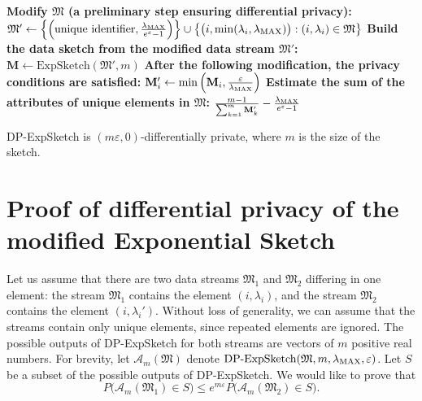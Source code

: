 \begin{algorithm}[htbp]
\caption{DP-ExpSketch($\mathfrak{M}, m, \lmax, \varepsilon$)}
\label{alg:df_expsketch}
\begin{algorithmic}[1]
\State \textbf{Modify $\mathfrak{M}$ (a preliminary step ensuring differential privacy):}
\State $\mathfrak{M}' \gets \left\{ \left(\text{unique identifier}, \frac{\lambda_{\mathrm{MAX}}}{e^\varepsilon - 1}\right) \right\} \cup \left\{ \bigl(i, \min(\lambda_i, \lambda_{\mathrm{MAX}})\bigr) : (i,\lambda_i) \in \mathfrak{M} \right\}$ \label{line:df_expsketch_modify_1}
\State
\State \textbf{Build the data sketch from the modified data stream $\mathfrak{M}'$:}
\State $\mathbf{M} \gets \mathrm{ExpSketch}(\mathfrak{M}', m)$ \label{line:df_expsketch_modify_2}
\State
\State \textbf{After the following modification, the privacy conditions are satisfied:}
    \State $\mathbf{M}'_{i} \gets \min\left(\mathbf{M}_{i}, \frac{\varepsilon}{\lambda_{\mathrm{MAX}}}\right)$ \label{line:df_expsketch_modify_3}
\EndFor
\State
\State \textbf{Estimate the sum of the attributes of unique elements in $\mathfrak{M}$:}
\State \Return $\frac{m-1}{\sum_{k=1}^{m} \mathbf{M}'_k} - \frac{\lambda_{\mathrm{MAX}}}{e^\varepsilon - 1}$ \label{line:df_expsketch_modify_4}
\end{algorithmic}
\end{algorithm}

\begin{theorem}
\label{theorem:DP-ExpSketch}
DP-ExpSketch is $(m\varepsilon, 0)$-differentially private, where $m$ is the size of the sketch.
\end{theorem}

\section{Proof of differential privacy of the modified Exponential Sketch}

Let us assume that there are two data streams $\mathfrak{M}_1$ and $\mathfrak{M}_2$ differing in one element: the stream $\mathfrak{M}_1$ contains the element $(i, \lambda_i)$, and the stream $\mathfrak{M}_2$ contains the element $(i, \lambda_i')$. Without loss of generality, we can assume that the streams contain only unique elements, since repeated elements are ignored. The possible outputs of DP-ExpSketch for both streams are vectors of $m$ positive real numbers. For brevity, let $\mathcal{A}_m(\mathfrak{M})$ denote $\text{DP-ExpSketch}(\mathfrak{M}, m, \lambda_{\mathrm{MAX}}, \varepsilon)$. Let $S$ be a subset of the possible outputs of DP-ExpSketch. We would like to prove that
\[
P\bigl(\mathcal{A}_m(\mathfrak{M}_1) \in S\bigr) \leq e^{m\varepsilon} P\bigl(\mathcal{A}_m(\mathfrak{M}_2) \in S\bigr).
\]

